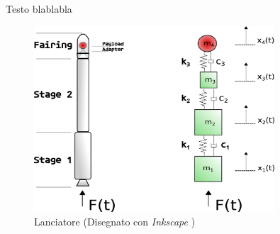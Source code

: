\documentclass{article}
\begin{document}
        Testo blablabla

        \begin{figure}[h!]
            \centering
            \label{fig:esercitazione2_drawing}
            \includegraphics[width=0.8\textwidth]{MUL2/Esercitazione2/Esercitazione2.eps}
            \caption{Lanciatore (Disegnato con \textit{Inkscape} \autocite{Inkscape})}
        \end{figure}



        \clearpage
        \printbibliography
\end{document}
